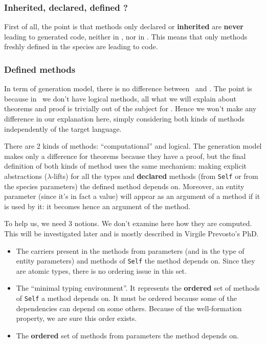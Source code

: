 \subsubsection{Inherited, declared, defined ?}
First of all, the point is that methods only declared or {\bf inherited}
are {\bf never} leading to generated code, neither in \ocaml, nor in
\coq. This means that only methods freshly defined in the species are
leading to code.

\subsubsection{Defined methods}
In term of generation model, there is no difference between \ocaml\
and \coq. The point is because in \ocaml\ we don't have logical
methods, all what we will explain about theorems and proof is
trivially out of the subject for \ocaml. Hence we won't make any
difference in our explanation here, simply considering both kinds of
methods independently of the target language.

There are 2 kinds of methods: ``computational'' and logical. The
generation model makes only a difference for theorems because they
have a proof, but the final definition of both kinds of method uses
the same mechanism: making explicit abstractions ($\lambda$-lifts) for
all the types and {\bf declared} methods (from {\tt Self} or from the
species parameters) the defined method depends on. Moreover, an entity
parameter (since it's in fact a value) will appear as an argument of a
method if it is used by it: it becomes hence an argument of the
method.

To help us, we need 3 notions. We don't examine here how they are
computed. This will be investigated later and is mostly described in
Virgile Prevosto's PhD.
\begin{itemize}
\item The carriers present in the methods from parameters (and in the
  type of entity parameters) and methods of {\tt Self} the method
  depends on. Since they are atomic types, there is no ordering issue
  in this set.
\item The ``minimal typing environment''. It represents the
  {\bf ordered} set of methods of {\tt Self} a method depends on. It
  must be ordered because some of the dependencies can depend on some
  others. Because of the well-formation property, we are sure this
  order exists.
\item The {\bf ordered} set of methods from parameters the method
  depends on.
\end{itemize}

